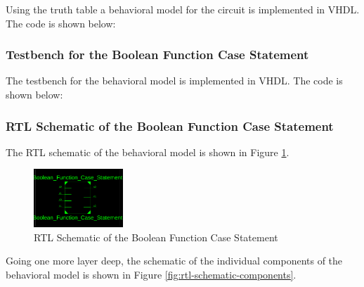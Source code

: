 \documentclass[table]{article}
\begin{document}
Using the truth table a behavioral model for the circuit is implemented in VHDL. The code is shown below:


\begin{center} %
    \lstset{
  caption= Boolean\_Function\_Case\_Statement.vhd, 
  basicstyle=\footnotesize, frame=tb,
  xleftmargin=.2\textwidth, xrightmargin=.2\textwidth
}
    

\end{center}

\subsubsection*{Testbench for the Boolean Function Case Statement}

The testbench for the behavioral model is implemented in VHDL. The code is shown below:

\begin{center} %
    \lstset{
  caption= Boolean\_Function\_Case\_Statement\_tb.vhd, 
  basicstyle=\footnotesize, frame=tb,
  xleftmargin=.2\textwidth, xrightmargin=.2\textwidth
}
    

\end{center}

\newpage
\subsubsection*{RTL Schematic of the Boolean Function Case Statement}

The RTL schematic of the behavioral model is shown in Figure \ref{fig:rtl-schematic}.
\begin{figure}[H]
    \centering
    \includegraphics[width=0.3\textwidth]{img/rtltop.png}
    \caption{RTL Schematic of the Boolean Function Case Statement}
    \label{fig:rtl-schematic}
\end{figure}

Going one more layer deep, the schematic of the individual components of the behavioral model is shown in Figure \ref{fig:rtl-schematic-components}.
\end{document}
